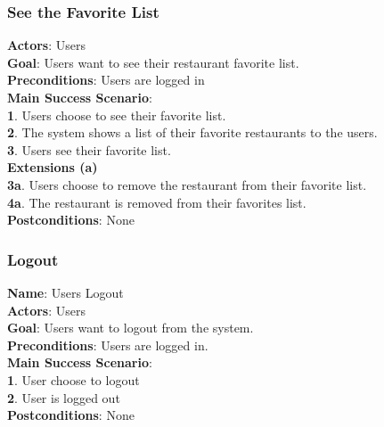 \documentclass[12pt,oneside,openright,a4paper]{cpe-english-project}
\begin{document}
\subsubsection{See the Favorite List}
\textbf{Actors}: Users\\
\textbf{Goal}: Users want to see their restaurant favorite list.\\
\textbf{Preconditions}: Users are logged in\\
\textbf{Main Success Scenario}: \\
\textbf{1}. Users choose to see their favorite list.\\
\textbf{2}. The system shows a list of their favorite restaurants to the users.\\
\textbf{3}. Users see their favorite list.\\
\textbf{Extensions (a)} \\
\textbf{3a}. Users choose to remove the restaurant from their favorite list.\\
\textbf{4a}. The restaurant is removed from their favorites list.\\
\textbf{Postconditions}: None

\subsubsection{Logout}
\textbf{Name}: Users Logout\\
\textbf{Actors}: Users\\
\textbf{Goal}: Users want to logout from the system.\\
\textbf{Preconditions}: Users are logged in.\\
\textbf{Main Success Scenario}: \\
\textbf{1}. User choose to logout\\
\textbf{2}. User is logged out\\
\textbf{Postconditions}: None


\newpage
\end{document}
